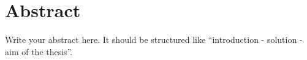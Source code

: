 
\chapter*{Abstract}
Write your abstract here. It should be structured like \enquote{introduction - solution - aim of the thesis}.